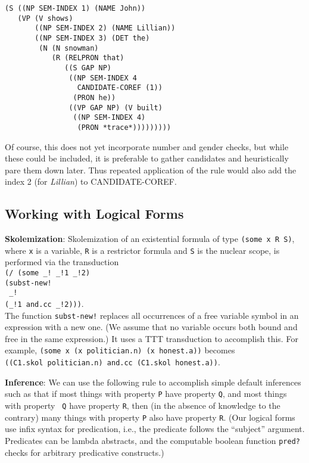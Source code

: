 \documentclass[a4,11pt]{article}
\begin{document}
\scriptsize
\begin{verbatim}
(S ((NP SEM-INDEX 1) (NAME John))
   (VP (V shows) 
       ((NP SEM-INDEX 2) (NAME Lillian))
       ((NP SEM-INDEX 3) (DET the)
        (N (N snowman)
           (R (RELPRON that)
              ((S GAP NP)
               ((NP SEM-INDEX 4 
                 CANDIDATE-COREF (1))
                (PRON he))
               ((VP GAP NP) (V built)
                ((NP SEM-INDEX 4) 
                 (PRON *trace*)))))))))
\end{verbatim}

\normalsize 
Of course, this does not yet incorporate number and gender checks, but
while these could be included, it is preferable to gather candidates
and heuristically pare them down later. Thus repeated application of the
rule would also add the index 2 (for {\it Lillian}) to CANDIDATE-COREF.

\subsection*{Working with Logical Forms}
{\bf Skolemization}:
Skolemization of an existential formula of type \texttt{(some x R S)}, where \texttt{x} is a variable, \texttt{R} is a restrictor formula and \texttt{S} is the nuclear scope, is performed via the transduction\\
\small
\hspace*{2em}\texttt{(/ (some \_!~\_!1 \_!2)}\\
\hspace*{4em}\texttt{(subst-new!}\\
\hspace*{9em}\texttt{ \_!}\\
\hspace*{9.5em}\texttt{(\_!1 and.cc \_!2)))}.\\
\normalsize
\noindent The function \texttt{subst-new!} replaces all occurrences of a free variable symbol in an expression with a new one. (We assume that no variable occurs both bound and free in the same expression.)  It uses a TTT transduction to accomplish this. 
For example, {\small\tt (some x (x politician.n) (x honest.a))} becomes\\
{\small\tt ((C1.skol politician.n) and.cc (C1.skol honest.a))}.

{\bf Inference}:
We can use the following rule to accomplish simple default inferences such as that if most things with property \texttt{P} have property \texttt{Q}, and most things with property \texttt{ Q} have property \texttt{R}, then (in the absence of knowledge to the contrary) many things with property \texttt{P} also have property \texttt{R}. (Our logical forms use infix syntax for predication, i.e., the predicate follows the ``subject'' argument. Predicates can be lambda abstracts, and the computable boolean function \texttt{pred?} checks for arbitrary predicative constructs.)
\end{document}
